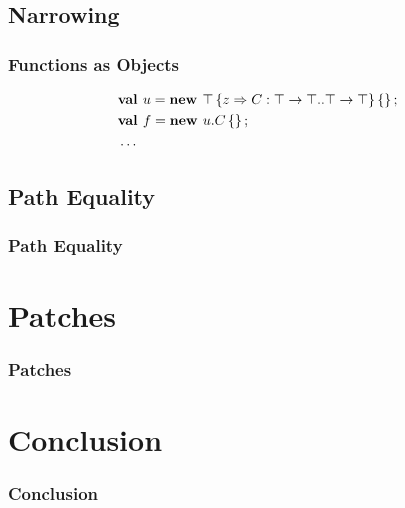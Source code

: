 \documentclass{beamer}
\begin{document}
\subsection{Narrowing}

  \begin{frame}
    \frametitle{Functions as Objects}
\begin{align*}
&\mlnew u {\Top \refine z {\Ldecl C {\Top \tfun \Top} {\Top \tfun \Top}} \ldefs{}} {
\mlnew f {u.C \ldefs{}} {
\ldots
}}
\end{align*}
  \end{frame}

\subsection{Path Equality}

  \begin{frame}
    \frametitle{Path Equality}
  \end{frame}

\section{Patches}

  \begin{frame}
    \frametitle{Patches}
  \end{frame}

\section{Conclusion}

  \begin{frame}
    \frametitle{Conclusion}
  \end{frame}
\end{document}
